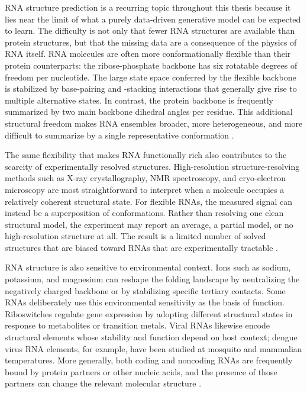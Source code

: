 RNA structure prediction is a recurring topic throughout this thesis because it lies near the limit of what a purely data-driven generative model can be expected to learn. The difficulty is not only that fewer RNA structures are available than protein structures, but that the missing data are a consequence of the physics of RNA itself. RNA molecules are often more conformationally flexible than their protein counterparts: the ribose-phosphate backbone has six rotatable degrees of freedom per nucleotide. The large state space conferred by the flexible backbone is stabilized by base-pairing and -stacking interactions that generally give rise to multiple alternative states. In contrast, the protein backbone is frequently summarized by two main backbone dihedral angles per residue. This additional structural freedom makes RNA ensembles broader, more heterogeneous, and more difficult to summarize by a single representative conformation \citep{brion1997hierarchy,Wadley2007RNApseudotorsional}.

The same flexibility that makes RNA functionally rich also contributes to the scarcity of experimentally resolved structures. High-resolution structure-resolving methods such as X-ray crystallography, NMR spectroscopy, and cryo-electron microscopy are most straightforward to interpret when a molecule occupies a relatively coherent structural state. For flexible RNAs, the measured signal can instead be a superposition of conformations. Rather than resolving one clean structural model, the experiment may report an average, a partial model, or no high-resolution structure at all. The result is a limited number of solved structures that are biased toward RNAs that are experimentally tractable \citep{berman2000protein,bowman2024alphafold}.

RNA structure is also sensitive to environmental context. Ions such as sodium, potassium, and magnesium can reshape the folding landscape by neutralizing the negatively charged backbone or by stabilizing specific tertiary contacts. Some RNAs deliberately use this environmental sensitivity as the basis of function. Riboswitches regulate gene expression by adopting different structural states in response to metabolites or transition metals. Viral RNAs likewise encode structural elements whose stability and function depend on host context; dengue virus RNA elements, for example, have been studied at mosquito and mammalian temperatures. More generally, both coding and noncoding RNAs are frequently bound by protein partners or other nucleic acids, and the presence of those partners can change the relevant molecular structure \citep{yamagami2021functional,huang2025some,Villordo2015DengueRNA}.

